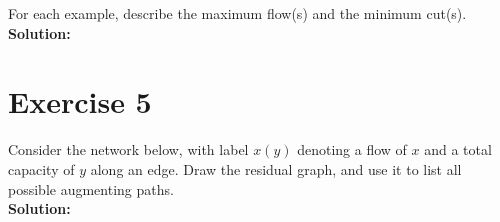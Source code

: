\documentclass{article}
\begin{document}
For each example, describe the maximum flow(s) and the minimum cut(s). \\

\textbf{Solution:} \\



\newpage

\section*{Exercise 5}
Consider the network below, with label $x(y)$ denoting a flow of $x$ and a total capacity of $y$ along an edge. Draw the residual graph, and use it to list all possible augmenting paths. \\

\textbf{Solution:} \\
\end{document}
